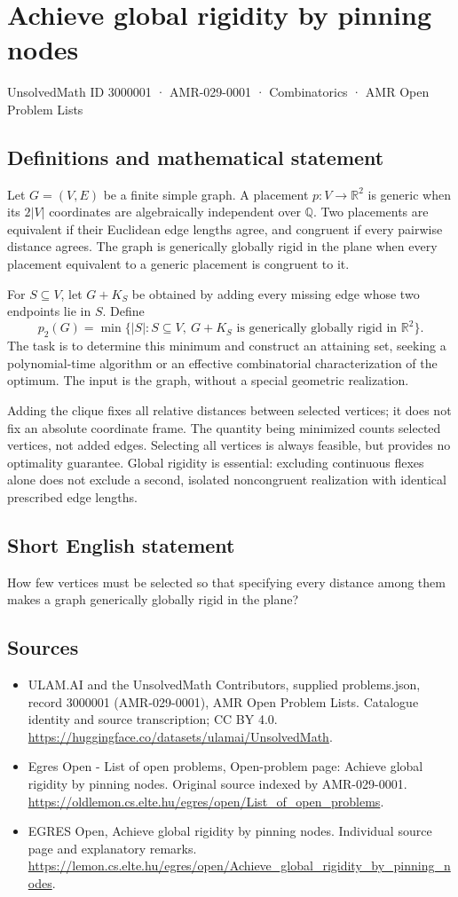 \documentclass[11pt,a4paper]{article}
\begin{document}
\section*{Achieve global rigidity by pinning nodes}\label{3000001}
{\small UnsolvedMath ID 3000001 · AMR-029-0001 · Combinatorics · AMR Open Problem Lists}
\subsection{Definitions and mathematical statement}
Let $G=(V,E)$ be a finite simple graph. A placement $p:V\to\mathbb R^2$
is generic when its $2|V|$ coordinates are algebraically independent over
$\mathbb Q$. Two placements are equivalent if their Euclidean edge lengths
agree, and congruent if every pairwise distance agrees. The graph is
generically globally rigid in the plane when every placement equivalent
to a generic placement is congruent to it.

For $S\subseteq V$, let $G+K_S$ be obtained by adding every missing edge
whose two endpoints lie in $S$. Define
\[
 p_2(G)=\min\{|S|:S\subseteq V,\ G+K_S
                     \text{ is generically globally rigid in }\mathbb R^2\}.
\]
The task is to determine this minimum and construct an attaining set,
seeking a polynomial-time algorithm or an effective combinatorial
characterization of the optimum. The input is the graph, without a
special geometric realization.

Adding the clique fixes all relative distances between selected vertices;
it does not fix an absolute coordinate frame. The quantity being minimized
counts selected vertices, not added edges. Selecting all vertices is always
feasible, but provides no optimality guarantee. Global rigidity is essential:
excluding continuous flexes alone does not exclude a second, isolated
noncongruent realization with identical prescribed edge lengths.
\subsection{Short English statement}
How few vertices must be selected so that specifying every distance
among them makes a graph generically globally rigid in the plane?
\subsection{Sources}
\begin{itemize}
\item[S1] ULAM.AI and the UnsolvedMath Contributors, supplied problems.json, record 3000001 (AMR-029-0001), AMR Open Problem Lists. Catalogue identity and source transcription; CC BY 4.0.
\url{https://huggingface.co/datasets/ulamai/UnsolvedMath}.
\item[S2] Egres Open - List of open problems, Open-problem page: Achieve global rigidity by pinning nodes. Original source indexed by AMR-029-0001.
\url{https://oldlemon.cs.elte.hu/egres/open/List_of_open_problems}.
\item[S3] EGRES Open, Achieve global rigidity by pinning nodes. Individual source page and explanatory remarks.
\url{https://lemon.cs.elte.hu/egres/open/Achieve_global_rigidity_by_pinning_nodes}.
\end{itemize}
\end{document}
